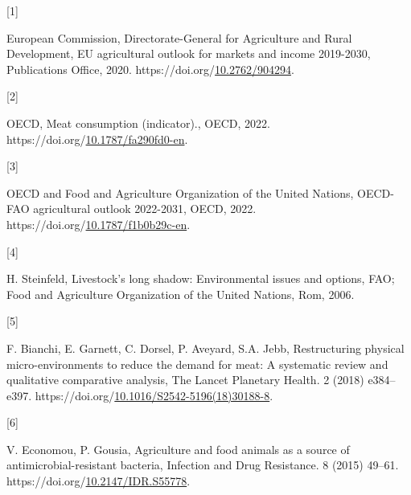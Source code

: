 \documentclass[preprint,3p,
a4paper]{elsarticle} %
\newlength{\cslhangindent}
\newlength{\csllabelwidth}
\newlength{\cslentryspacingunit} %
\newenvironment{CSLReferences}[2] %
 {%
  \setlength{\parindent}{0pt}
  \ifodd #1
  \let\oldpar\par
  \def\par{\hangindent=\cslhangindent\oldpar}
  \fi
  \setlength{\parskip}{#2\cslentryspacingunit}
 }%
 {}
\newcommand{\CSLLeftMargin}[1]{\parbox[t]{\csllabelwidth}{#1}}
\newcommand{\CSLRightInline}[1]{\parbox[t]{\linewidth - \csllabelwidth}{#1}\break}
\begin{document}
\hypertarget{refs}{}
\begin{CSLReferences}{0}{0}
\leavevmode{}%
\CSLLeftMargin{{[}1{]} }%
\CSLRightInline{European Commission, Directorate-General for Agriculture
and Rural Development, EU agricultural outlook for markets and income
2019-2030, {Publications Office}, 2020.
https://doi.org/\href{https://doi.org/10.2762/904294}{10.2762/904294}.}

\leavevmode{}%
\CSLLeftMargin{{[}2{]} }%
\CSLRightInline{OECD, Meat consumption (indicator)., OECD, 2022.
https://doi.org/\href{https://doi.org/10.1787/fa290fd0-en}{10.1787/fa290fd0-en}.}

\leavevmode{}%
\CSLLeftMargin{{[}3{]} }%
\CSLRightInline{OECD and Food and Agriculture Organization of the United
Nations, OECD-FAO agricultural outlook 2022-2031, OECD, 2022.
https://doi.org/\href{https://doi.org/10.1787/f1b0b29c-en}{10.1787/f1b0b29c-en}.}

\leavevmode{}%
\CSLLeftMargin{{[}4{]} }%
\CSLRightInline{H. Steinfeld, Livestock's long shadow: Environmental
issues and options, FAO; {Food and Agriculture Organization of the
United Nations}, Rom, 2006.}

\leavevmode{}%
\CSLLeftMargin{{[}5{]} }%
\CSLRightInline{F. Bianchi, E. Garnett, C. Dorsel, P. Aveyard, S.A.
Jebb, Restructuring physical micro-environments to reduce the demand for
meat: A systematic review and qualitative comparative analysis, The
Lancet Planetary Health. 2 (2018) e384--e397.
https://doi.org/\href{https://doi.org/10.1016/S2542-5196(18)30188-8}{10.1016/S2542-5196(18)30188-8}.}

\leavevmode{}%
\CSLLeftMargin{{[}6{]} }%
\CSLRightInline{V. Economou, P. Gousia, Agriculture and food animals as
a source of antimicrobial-resistant bacteria, Infection and Drug
Resistance. 8 (2015) 49--61.
https://doi.org/\href{https://doi.org/10.2147/IDR.S55778}{10.2147/IDR.S55778}.}


\end{CSLReferences}
\end{document}
